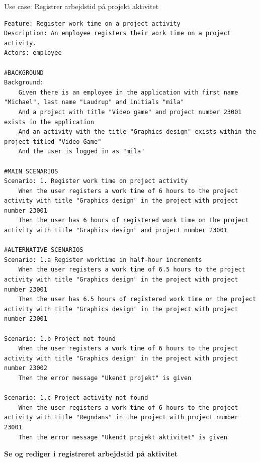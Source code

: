 \begin{listing}[H]
    \centering
    \caption{Use case: Registrer arbejdstid på projekt aktivitet} \label{lst:usecase_register_worktime_projectactivity}
    \begin{verbatim}  
Feature: Register work time on a project activity
Description: An employee registers their work time on a project activity.
Actors: employee

#BACKGROUND
Background:
    Given there is an employee in the application with first name "Michael", last name "Laudrup" and initials "mila"
    And a project with title "Video game" and project number 23001 exists in the application
    And an activity with the title "Graphics design" exists within the project titled "Video Game"
    And the user is logged in as "mila"

#MAIN SCENARIOS
Scenario: 1. Register work time on project activity
    When the user registers a work time of 6 hours to the project activity with title "Graphics design" in the project with project number 23001
    Then the user has 6 hours of registered work time on the project activity with title "Graphics design" and project number 23001

#ALTERNATIVE SCENARIOS
Scenario: 1.a Register worktime in half-hour increments
    When the user registers a work time of 6.5 hours to the project activity with title "Graphics design" in the project with project number 23001
    Then the user has 6.5 hours of registered work time on the project activity with title "Graphics design" in the project with project number 23001

Scenario: 1.b Project not found
    When the user registers a work time of 6 hours to the project activity with title "Graphics design" in the project with project number 23002
    Then the error message "Ukendt projekt" is given 
    
Scenario: 1.c Project activity not found
    When the user registers a work time of 6 hours to the project activity with title "Regndans" in the project with project number 23001
    Then the error message "Ukendt projekt aktivitet" is given 
    \end{verbatim}
\end{listing}
\textbf{Se og rediger i registreret arbejdstid på aktivitet}
